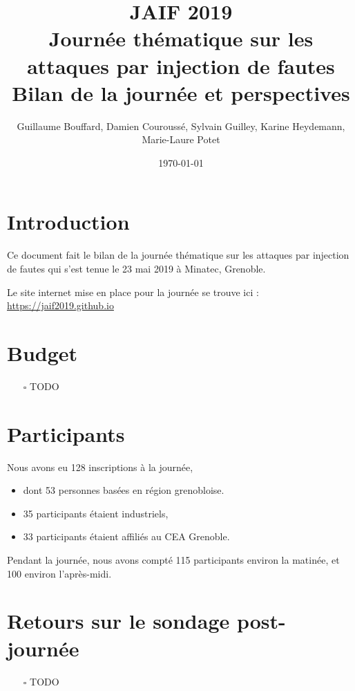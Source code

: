 \documentclass[a4paper,11pt]{article}
\author{Guillaume Bouffard,  Damien Couroussé, Sylvain Guilley,  Karine Heydemann, Marie-Laure Potet}
\date{\today}
\title{JAIF 2019 \\ Journée thématique sur les attaques par injection de fautes\\\medskip
\large Bilan de la journée et perspectives}
\begin{document}
\maketitle
\tableofcontents


\section{Introduction}
\label{sec:org0e8c7aa}

Ce document fait le bilan de la journée thématique sur les attaques
par injection de fautes qui s'est tenue le 23 mai 2019 à Minatec, Grenoble.

Le site internet mise en place pour la journée se trouve ici :
\url{https://jaif2019.github.io}

\section{Budget}
\label{sec:org2aa02ce}

\begin{itemize}
\item[{$\square$}] TODO
\end{itemize}

\section{Participants}
\label{sec:org54da921}

Nous avons eu 128 inscriptions à la journée,
\begin{itemize}
\item dont 53 personnes basées en région grenobloise.
\item 35 participants étaient industriels,
\item 33 participants étaient affiliés au CEA Grenoble.
\end{itemize}

Pendant la journée, nous avons compté 115 participants environ la
matinée, et 100 environ l'après-midi.

\section{Retours sur le sondage post-journée}
\label{sec:orgc2f2572}

\begin{itemize}
\item[{$\square$}] TODO
\end{itemize}
\end{document}

